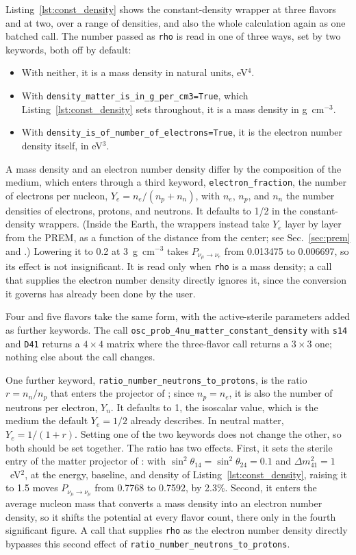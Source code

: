 Listing~\ref{lst:const_density} shows the constant-density wrapper at three flavors and at two, over a range of densities, and also the whole calculation again as one batched call. The number passed as {\tt rho} is read in one of three ways, set by two keywords, both off by default:
\begin{itemize}
\item With neither, it is a mass density in natural units, eV$^4$.
\item With {\tt density\_matter\_is\_in\_g\_per\_cm3=True}, which Listing~\ref{lst:const_density} sets throughout, it is a mass density in g~cm$^{-3}$.
\item With {\tt density\_is\_of\_number\_of\_electrons=True}, it is the electron number density itself, in eV$^3$.
\end{itemize}

A mass density and an electron number density differ by the composition of the medium, which enters through a third keyword, {\tt electron\_fraction}, the number of electrons per nucleon, $Y_e = n_e/(n_p + n_n)$, with $n_e$, $n_p$, and $n_n$ the number densities of electrons, protons, and neutrons. It defaults to 1/2 in the constant-density wrappers. (Inside the Earth, the wrappers instead take $Y_e$ layer by layer from the PREM, as a function of the distance from the center; see Sec.~\ref{sec:prem} and .) Lowering it to 0.2 at 3~g~cm$^{-3}$ takes $P_{\nu_\mu \to \nu_e}$ from 0.013475 to 0.006697, so its effect is not insignificant. It is read only when {\tt rho} is a mass density; a call that supplies the electron number density directly ignores it, since the conversion it governs has already been done by the user.

Four and five flavors take the same form, with the active-sterile parameters added as further keywords. The call {\tt osc\_prob\_4nu\_matter\_constant\_density} with {\tt s14} and {\tt D41} returns a $4 \times 4$ matrix where the three-flavor call returns a $3 \times 3$ one; nothing else about the call changes.

One further keyword, {\tt ratio\_number\_neutrons\_to\_protons}, is the ratio $r = n_n/n_p$ that enters the projector of ; since $n_p = n_e$, it is also the number of neutrons per electron, $Y_n$. It defaults to 1, the isoscalar value, which is the medium the default $Y_e = 1/2$ already describes. In neutral matter, $Y_e = 1/(1 + r)$. Setting one of the two keywords does not change the other, so both should be set together. The ratio has two effects. First, it sets the sterile entry of the matter projector of : with $\sin^2\theta_{14} = \sin^2\theta_{24} = 0.1$ and $\Delta m^2_{41} = 1$~eV$^2$, at the energy, baseline, and density of Listing~\ref{lst:const_density}, raising it to 1.5 moves $P_{\nu_\mu \to \nu_\mu}$ from 0.7768 to 0.7592, by 2.3\%. Second, it enters the average nucleon mass that converts a mass density into an electron number density, so it shifts the potential at every flavor count, there only in the fourth significant figure. A call that supplies {\tt rho} as the electron number density directly bypasses this second effect of {\tt ratio\_number\_neutrons\_to\_protons}.
